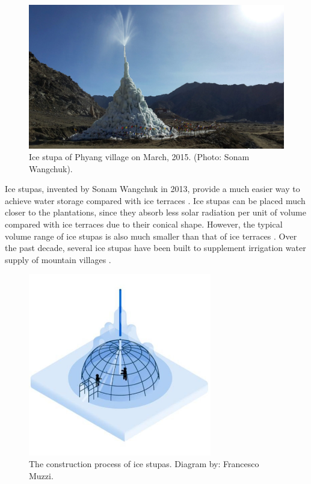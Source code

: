 \begin{figure}[htb]
	\centering
	\includegraphics[width=\textwidth]{figs/IS_example.jpg}
	\caption{Ice stupa of Phyang village on March, 2015. (Photo: Sonam Wangchuk).}
	\label{fig:ISexample}
\end{figure}

Ice stupas, invented by Sonam Wangchuk in 2013, provide a much easier way to achieve water storage compared with
ice terraces \citep{wangchukIceStupaArtificial2014}. Ice stupas can be placed much closer to the plantations,
since they absorb less solar radiation per unit of volume compared with ice terraces due to their conical shape.
However, the typical volume range of ice stupas is also much smaller than that of ice terraces
\citep{nusserSociohydrologyArtificialGlaciers2019}. Over the past decade, several ice stupas have been built to
supplement irrigation water supply of mountain villages \citep{wangchukIceStupaCompetition2020,
palmerStoringFrozenWater2022, aggarwalAdaptationClimateChange2021}.


\begin{figure}[htb]
	\centering
	\includegraphics[width=8cm]{figs/IS_science.jpg}
	\caption{The construction process of ice stupas. Diagram by: Francesco Muzzi. }
	\label{fig:ISconstruction}
\end{figure}

